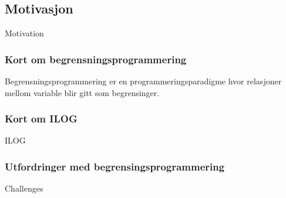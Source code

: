 \subsection{Motivasjon}
Motivation

\subsubsection{Kort om begrensningsprogrammering}
Begrensningsprogrammering er en programmeringsparadigme hvor relasjoner mellom variable blir gitt som begrensinger.

\subsubsection{Kort om ILOG}
ILOG

\subsubsection{Utfordringer med begrensingsprogrammering}
Challenges